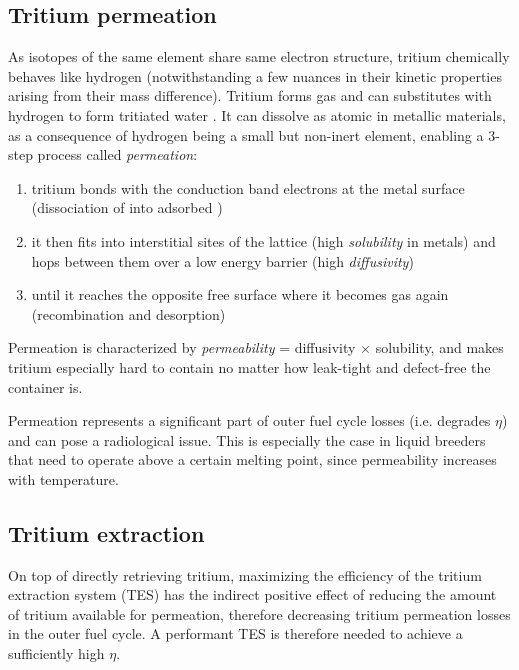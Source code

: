 \documentclass[a4paper,11pt,oneside]{report}
\begin{document}
\subsection{Tritium permeation}
As isotopes of the same element share same electron structure, tritium chemically behaves like hydrogen (notwithstanding a few nuances in their kinetic properties arising from their mass difference). Tritium forms  gas and can substitutes with hydrogen to form tritiated water . It can dissolve as atomic  in metallic materials, as a consequence of hydrogen being a small but non-inert element, enabling a 3-step process called \textit{permeation}: 
\begin{enumerate}
    \item tritium bonds with the conduction band electrons at the metal surface (dissociation of  into adsorbed )
    \item it then fits into interstitial sites of the lattice (high \textit{solubility} in metals) and hops between them over a low energy barrier (high \textit{diffusivity})
    \item  until it reaches the opposite free surface where it becomes  gas again (recombination and desorption)
\end{enumerate}
Permeation is characterized by \textit{permeability} = diffusivity $\times$ solubility, and makes tritium especially hard to contain no matter how leak-tight and defect-free the container is. 

Permeation represents a significant part of outer fuel cycle losses (i.e. degrades $\eta$) and can pose a radiological issue. This is especially the case in liquid breeders that need to operate above a certain melting point, since permeability increases with temperature. 

\subsection{Tritium extraction}
On top of directly retrieving tritium, maximizing the efficiency of the tritium extraction system (TES) has the indirect positive effect of reducing the amount of tritium available for permeation, therefore decreasing tritium permeation losses in the outer fuel cycle. A performant TES is therefore needed to achieve a sufficiently high $\eta$. 
\end{document}
